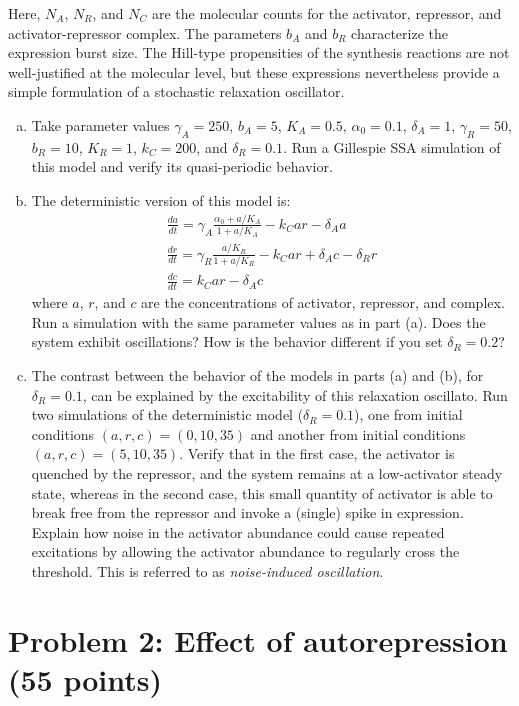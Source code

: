 \documentclass{article}
\begin{document}
Here, $N_A$, $N_R$, and $N_C$ are the molecular counts for the activator, repressor, and activator-repressor complex. The parameters $b_A$ and $b_R$ characterize the expression burst size. The Hill-type propensities of the synthesis reactions are not well-justified at the molecular level, but these expressions nevertheless provide a simple formulation of a stochastic relaxation oscillator.

\begin{enumerate}[a)]
\item Take parameter values $\gamma_A = 250$, $b_A = 5$, $K_A = 0.5$, $\alpha_0 = 0.1$, $\delta_A = 1$, $\gamma_R = 50$, $b_R = 10$, $K_R=1$, $k_C = 200$, and $\delta_R = 0.1$. Run a Gillespie SSA simulation of this model and verify its quasi-periodic behavior.
\item The deterministic version of this model is:
\begin{eqnarray*}
\frac{da}{dt} = \gamma_A \frac{\alpha_0 + a/K_A}{1 + a/K_A} - k_C a r - \delta_A a\\
\frac{dr}{dt} = \gamma_R \frac{a/K_R}{1 + a/K_R} - k_C a r + \delta_A c - \delta_R r\\
\frac{dc}{dt} =  k_C a r - \delta_A c
\end{eqnarray*}
where $a$, $r$, and $c$ are the concentrations of activator, repressor, and complex. Run a simulation with the same parameter values as in part (a). Does the system exhibit oscillations? How is the behavior different if you set $\delta_R=0.2$?
\item The contrast between the behavior of the models in parts (a) and (b), for $\delta_R=0.1$, can be explained by the excitability of this relaxation oscillato. Run two simulations of the deterministic model ($\delta_R=0.1$), one from initial conditions $(a,r,c)=(0,10,35)$ and another from initial conditions $(a,r,c)=(5,10,35)$. Verify that in the first case, the activator is quenched by the repressor, and the system remains at a low-activator steady state, whereas in the second case, this small quantity of activator is able to break free from the repressor and invoke a (single) spike in expression. Explain how noise in the activator abundance could cause repeated excitations by allowing the activator abundance to regularly cross the threshold. This is referred to as \textit{noise-induced oscillation}.
\end{enumerate}

\section*{Problem 2: Effect of autorepression (55 points)}
\end{document}
